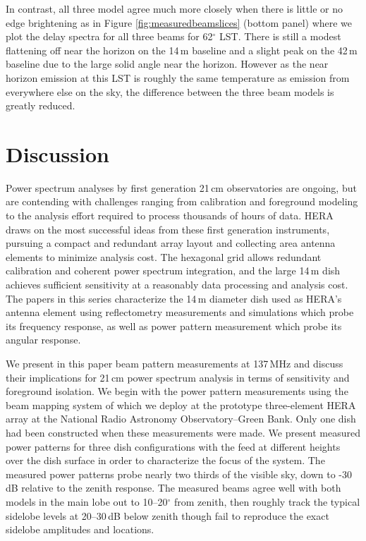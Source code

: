 \documentclass{emulateapj}
\begin{document}
In contrast, all three model agree much more closely when there is little or no edge brightening as in Figure \ref{fig:measuredbeamslices} (bottom panel) where we plot the delay spectra for all three beams for 62$^\circ$ LST. There is still a modest flattening off near the horizon on the 14\,m baseline and a slight peak on the 42\,m baseline due to the large solid angle near the horizon. However as the near horizon emission at this LST is roughly the same temperature as emission from everywhere else on the sky, the difference between the three beam models is greatly reduced.

\section{Discussion}


Power spectrum analyses by first generation 21\,cm observatories are ongoing, but are contending with challenges ranging from calibration and foreground modeling to the analysis effort required to process thousands of hours of data. HERA draws on the most successful ideas from these first generation instruments, pursuing a compact and redundant array layout and collecting area antenna elements to minimize analysis cost. The hexagonal grid allows redundant calibration and coherent power spectrum integration, and the large 14\,m dish achieves sufficient sensitivity at a reasonably data processing and analysis cost. The papers in this series characterize the 14\,m diameter dish used as HERA's antenna element using reflectometry measurements and simulations which probe its frequency response, as well as power pattern measurement which probe its angular response. 


We present in this paper beam pattern measurements at 137\,MHz and discuss their implications for 21\,cm power spectrum analysis in terms of sensitivity and foreground isolation. We begin with the power pattern measurements using the beam mapping system of \citet{neben15} which we deploy at the prototype three-element HERA array at the National Radio Astronomy Observatory--Green Bank. Only one dish had been constructed when these measurements were made. We present measured power patterns for three dish configurations with the feed at different heights over the dish surface in order to characterize the focus of the system. The measured power patterns probe nearly two thirds of the visible sky, down to -30\,dB relative to the zenith response. The measured beams agree well with both models in the main lobe out to 10--20$^\circ$ from zenith, then roughly track the typical sidelobe levels at 20--30\,dB below zenith though fail to reproduce the exact sidelobe amplitudes and locations. 
\end{document}
